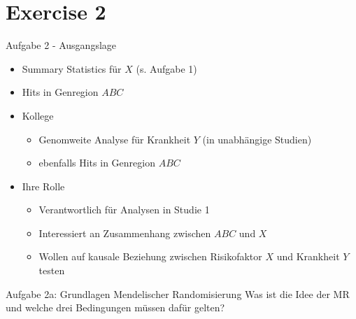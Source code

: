 \documentclass{beamer}
\begin{document}
\section{Exercise 2}

\begin{frame}{Aufgabe 2 - Ausgangslage}
\begin{itemize}
    \item Summary Statistics für $X$ (s. Aufgabe 1)
    \item Hits in Genregion $ABC$
    \item Kollege
    \begin{itemize}
        \item Genomweite Analyse für Krankheit $Y$ (in unabhängige Studien)
        \item ebenfalls Hits in Genregion $ABC$
    \end{itemize}
    \item Ihre Rolle
    \begin{itemize}
        \item Verantwortlich für Analysen in Studie 1
        \item Interessiert an Zusammenhang zwischen $ABC$ und $X$
        \item Wollen auf kausale Beziehung zwischen Risikofaktor $X$ und Krankheit $Y$ testen
    \end{itemize}
\end{itemize} 
\end{frame}

\begin{frame}{Aufgabe 2a: Grundlagen Mendelischer Randomisierung}
Was ist die Idee der MR und welche drei Bedingungen müssen dafür gelten?
\end{frame}
\end{document}
